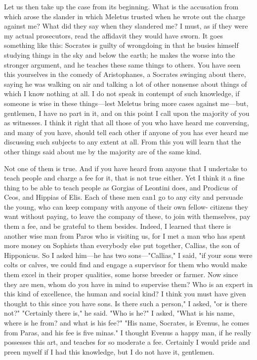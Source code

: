 Let us then take up the case from its beginning. What is the accusation from which arose the
slander in which Meletus trusted when he wrote out the charge against me? What did they say
when they slandered me? I must, as if they were my actual prosecutors, read the affidavit they
would have sworn. It goes something like this: Socrates is guilty of wrongdoing in that he busies
himself studying things in the sky and below the earth; he makes the worse into the stronger
argument, and he teaches these same things to others. You have seen this yourselves in the comedy
of Aristophanes, a Socrates swinging about there, saying he was walking on air and talking a lot
of other nonsense about things of which I know nothing at all. I do not speak in contempt of such
knowledge, if someone is wise in these things—lest Meletus bring more cases against me—but,
gentlemen, I have no part in it, and on this point I call upon the majority of you as witnesses. I
think it right that all those of you who have heard me conversing, and many of you have, should
tell each other if anyone of you has ever heard me discussing such subjects to any extent at all.
From this you will learn that the other things said about me by the majority are of the same kind.

Not one of them is true. And if you have heard from anyone that I undertake to teach people
and charge a fee for it, that is not true either. Yet I think it a fine thing to be able to teach people
as Gorgias of Leontini does, and Prodicus of Ceos, and Hippias of Elis. Each of these men can1
go to any city and persuade the young, who can keep company with anyone of their own fellow-
citizens they want without paying, to leave the company of these, to join with themselves, pay
them a fee, and be grateful to them besides. Indeed, I learned that there is another wise man from
Paros who is visiting us, for I met a man who has spent more money on Sophists than everybody
else put together, Callias, the son of Hipponicus. So I asked him—he has two sons—"Callias," I
said, "if your sons were colts or calves, we could find and engage a supervisor for them who would
make them excel in their proper qualities, some horse breeder or farmer. Now since they are men,
whom do you have in mind to supervise them? Who is an expert in this kind of excellence, the
human and social kind? I think you must have given thought to this since you have sons. Is there
such a person," I asked, "or is there not?" "Certainly there is," he said. "Who is he?" I asked,
"What is his name, where is he from? and what is his fee?" "His name, Socrates, is Evenus, he
comes from Paras, and his fee is five minas." I thought Evenus a happy man, if he really possesses
this art, and teaches for so moderate a fee. Certainly I would pride and preen myself if I had this
knowledge, but I do not have it, gentlemen.

